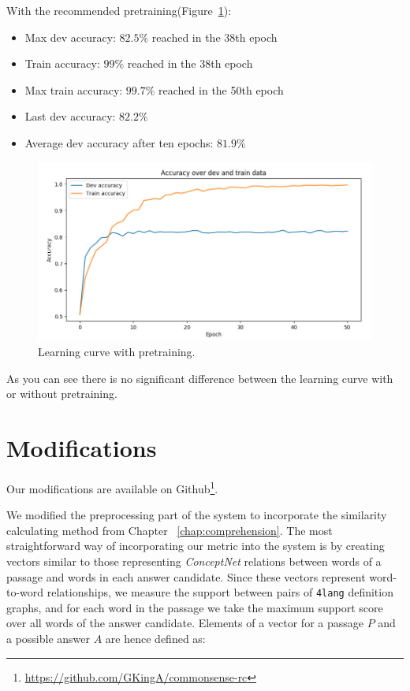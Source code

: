 \begin{minipage}{\linewidth}
	With the recommended pretraining(Figure~\ref{fig:learning_curve2}):
	\begin{itemize}
		\item Max dev accuracy: $82.5\%$ reached in the 38th epoch
		\item Train accuracy: $99\%$ reached in the 38th epoch
		\item Max train accuracy: $99.7\%$ reached in the 50th epoch
		\item Last dev accuracy: $82.2\%$
		\item Average dev accuracy after ten epochs: $81.9\%$
	\end{itemize}
\end{minipage}
\begin{figure}[!htb]
	\centering
	\includegraphics[scale=0.5]{figures/learning_curve2.jpg}
	\caption{Learning curve with pretraining.}
	\label{fig:learning_curve2}
\end{figure}

As you can see there is no significant difference between the learning curve with or without pretraining.

\section{Modifications}
Our modifications are available on Github\footnote{\url{https://github.com/GKingA/commonsense-rc}}.

We modified the preprocessing part of the system to incorporate the similarity calculating method from Chapter ~\ref{chap:comprehension}. The most straightforward way of incorporating our metric into the system is by creating vectors similar to those representing \textit{ConceptNet} relations between words of a passage and words in each answer candidate. Since these vectors represent
word-to-word relationships, we measure the support between pairs of \texttt{4lang} definition graphs, and for each word in the passage we take the maximum support score over all words of the answer candidate. Elements of a vector for a passage $P$ and a possible answer $A$ are hence defined as:

